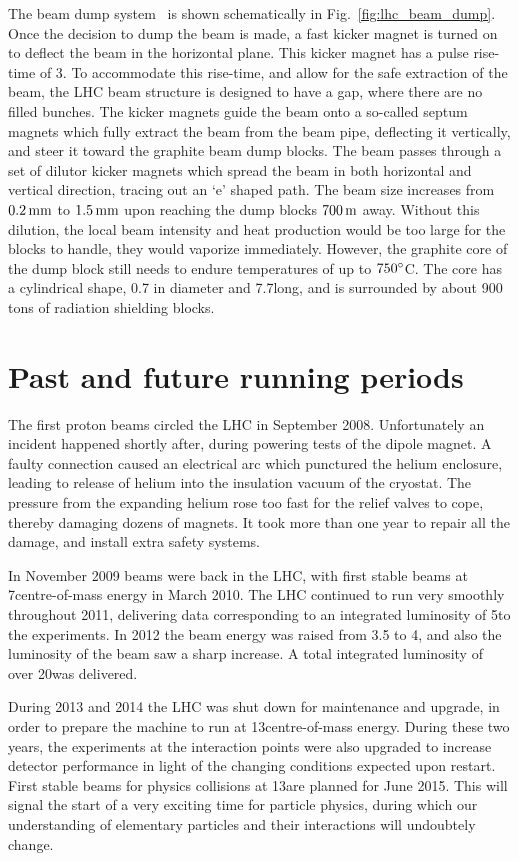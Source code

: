 The beam dump system~\cite{Schmidt:2006mi} is shown schematically in Fig.~\ref{fig:lhc_beam_dump}. 
Once the decision to dump the beam is made, a fast kicker magnet is turned on to deflect the beam
in the horizontal plane. 
This kicker magnet has a pulse rise-time of 3\mus. To accommodate this rise-time, and allow for
the safe extraction of the beam, the LHC beam structure is designed to have a gap, where there are
no filled bunches.
The kicker magnets guide the beam onto a so-called septum magnets which fully extract the beam from
the beam pipe, deflecting it vertically, and steer it toward the graphite beam dump blocks. The
beam passes through a set of dilutor kicker magnets which spread the beam in both horizontal and
vertical direction, tracing out an `e' shaped path. 
The beam size increases from $0.2\mm$ to $1.5\mm$ upon reaching the dump blocks $700\meter$ away.
Without this dilution, the local beam intensity and heat production would be too large for the
blocks to handle, they would vaporize immediately. However, the graphite core of the dump block
still needs to endure temperatures of up to $750\de$C. The core has a cylindrical shape, 0.7\meter
in diameter and 7.7\meter long, and is surrounded by about 900 tons of radiation shielding blocks.


\section{Past and future running periods}

The first proton beams circled the LHC in September 2008. Unfortunately an incident happened
shortly after, during powering tests of the dipole magnet. A faulty connection caused  an electrical
arc which punctured the helium enclosure, leading to release of helium into the insulation vacuum of
the cryostat. The pressure from the expanding helium rose too fast for the relief valves to cope,
thereby damaging dozens of magnets. It took more than one year to repair all the damage, and
install extra safety systems. 

In November 2009 beams were back in the LHC, with first stable beams
at 7\TeV centre-of-mass energy in March 2010. The LHC continued to run very smoothly throughout
2011, delivering data corresponding to an integrated luminosity of 5\fbinv to the experiments.  
In 2012 the beam energy was raised from 3.5 to 4\TeV, and also the luminosity of the beam saw a
sharp increase. A total integrated luminosity of over 20\fbinv was delivered. 

During 2013 and 2014 the LHC was shut down for maintenance and upgrade, in order to prepare the
machine to run at 13\TeV centre-of-mass energy. During these two years, the experiments at the
interaction points were also upgraded to increase detector performance in light of the changing
conditions expected upon restart. 
First stable beams for physics collisions at 13\TeV are planned for June 2015. This will signal the
start of a very exciting time for particle physics, during which our understanding of elementary
particles and their interactions will undoubtely change. 


